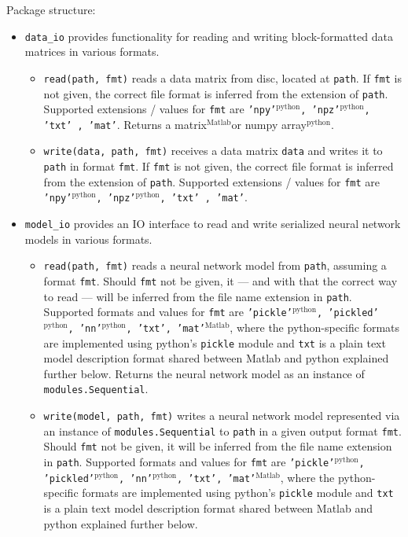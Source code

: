 \documentclass[a4wide]{article}
\newcommand{\mat}{$^\text{Matlab}$}
\newcommand{\py}{$^\text{python}$}
\begin{document}
Package structure:
\begin{itemize}
\item \texttt{data\_io} provides functionality for reading and writing block-formatted data matrices in various formats. 
	\begin{itemize}
	
		\item \texttt{read(path, fmt)} reads a data matrix from disc, located at \texttt{path}. If \texttt{fmt} is not given, the correct file format is inferred from the extension of \texttt{path}. Supported extensions / values for \texttt{fmt} are \texttt{'npy'\py , 'npz'\py , 'txt' , 'mat'}. Returns a matrix\mat or numpy array\py.
		
		\item \texttt{write(data, path, fmt)} receives a data matrix \texttt{data} and writes it to \texttt{path} in format \texttt{fmt}. If \texttt{fmt} is not given, the correct file format is inferred from the extension of \texttt{path}. Supported extensions / values for \texttt{fmt} are \texttt{'npy'\py , 'npz'\py , 'txt' , 'mat'}.
		
	\end{itemize}
\item \texttt{model\_io} provides an IO interface to read and write serialized neural network models in various formats.
	\begin{itemize}
		\item \texttt{read(path, fmt)} reads a neural network model from \texttt{path}, assuming a format \texttt{fmt}. Should \texttt{fmt} not be given, it --- and with that the correct way to read --- will be inferred from the file name extension in \texttt{path}. Supported formats and values for \texttt{fmt} are \texttt{'pickle'\py , 'pickled'\py , 'nn'\py, 'txt', 'mat'\mat}, where the python-specific formats are implemented using python's \texttt{pickle} module and \texttt{txt} is a plain text model description format shared between Matlab and python explained further below. Returns the neural network model as an instance of \texttt{modules.Sequential}.


		\item \texttt{write(model, path, fmt)} writes a neural network model represented via an instance of \texttt{modules.Sequential} to \texttt{path} in a given output format \texttt{fmt}. Should \texttt{fmt} not be given, it will be inferred from the file name extension in \texttt{path}. Supported formats and values for \texttt{fmt} are \texttt{'pickle'\py , 'pickled'\py , 'nn'\py, 'txt', 'mat'\mat}, where the python-specific formats are implemented using python's \texttt{pickle} module and \texttt{txt} is a plain text model description format shared between Matlab and python explained further below.
		

\end{itemize}
\end{itemize}
\end{document}

